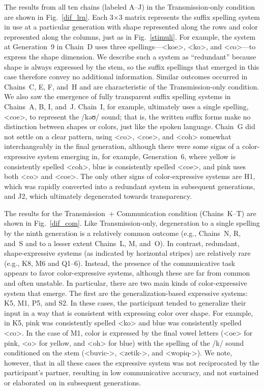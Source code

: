 \documentclass[doc,biblatex]{apa7}
\begin{document}
The results from all ten chains (labeled A--J) in the Transmission-only condition are shown in Fig.~\ref{dif_lrn}. Each 3×3 matrix represents the suffix spelling system in use at a particular generation with shape represented along the rows and color represented along the columns, just as in Fig.~\ref{stimuli}. For example, the system at Generation~9 in Chain~D uses three spellings---<koe>, <ko>, and <co>---to express the shape dimension. We describe such a system as ``redundant'' because shape is always expressed by the stem, so the suffix spellings that emerged in this case therefore convey no additional information. Similar outcomes occurred in Chains~C, E, F, and~H and are characteristic of the Transmission-only condition. We also saw the emergence of fully transparent suffix spelling systems in Chains~A, B, I, and~J. Chain~I, for example, ultimately uses a single spelling, <coe>, to represent the /kəʊ/ sound; that is, the written suffix forms make no distinction between shapes or colors, just like the spoken language. Chain~G did not settle on a clear pattern, using <co>, <coe>, and <coh> somewhat interchangeably in the final generation, although there were some signs of a color-expressive system emerging in, for example, Generation~6, where yellow is consistently spelled <coh>, blue is consistently spelled <coe>, and pink uses both <co> and <coe>. The only other signs of color-expressive systems are H1, which was rapidly converted into a redundant system in subsequent generations, and J2, which ultimately degenerated towards transparency.

The results for the Transmission~+ Communication condition (Chains~K--T) are shown in Fig.~\ref{dif_com}. Like Transmission-only, degeneration to a single spelling by the ninth generation is a relatively common outcome (e.g., Chains~N, R, and~S and to a lesser extent Chains~L, M, and~O). In contrast, redundant, shape-expressive systems (as indicated by horizontal stripes) are relatively rare (e.g., K8, M6 and Q1--6). Instead, the presence of the communicative task appears to favor color-expressive systems, although these are far from common and often unstable. In particular, there are two main kinds of color-expressive system that emerge. The first are the generalization-based expressive systems: K5, M1, P5, and S2. In these cases, the participant tended to generalize their input in a way that is consistent with expressing color over shape. For example, in K5, pink was consistently spelled <ko> and blue was consistently spelled <co>. In the case of M1, color is expressed by the final vowel letters (<oe> for pink, <o> for yellow, and <oh> for blue) with the spelling of the /k/ sound conditioned on the stem (<buvic->, <zetik->, and <wopiq->). We note, however, that in all these cases the expressive system was not reciprocated by the participant's partner, resulting in low communicative accuracy, and not sustained or elaborated~on in subsequent generations.
\end{document}
